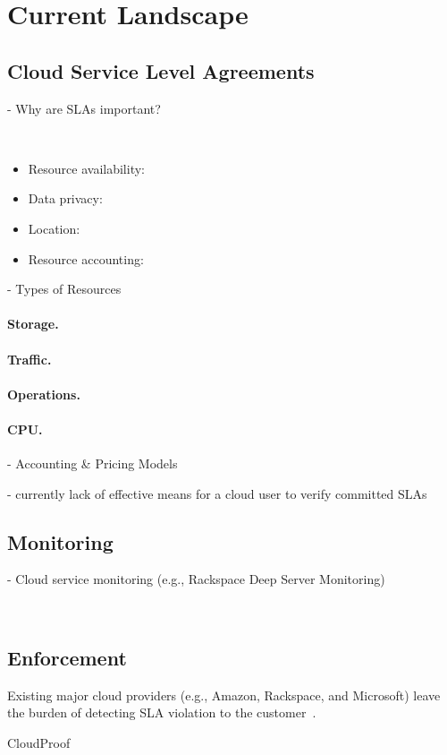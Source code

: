 \section{Current Landscape} \label{sect:current-practice}

\subsection{Cloud Service Level Agreements} \label{sect:sla-overview}

- Why are SLAs important?

~\cite{Ahr+10,FMM+13,Kyr13}

\begin{itemize}
 \item Resource availability:
 \item Data privacy:
 \item Location:
 \item Resource accounting:
\end{itemize}




- Types of Resources

\paragraph{Storage.}

\paragraph{Traffic.}

\paragraph{Operations.}

\paragraph{CPU.}

- Accounting \& Pricing Models~\cite{MMS13}


- currently lack of effective means for a cloud user to verify committed SLAs


\subsection{Monitoring} \label{sect:sla-monitoring}

- Cloud service monitoring (e.g., Rackspace Deep Server Monitoring)

~\cite{ABD+13,FEH+14}

\subsection{Enforcement} \label{sect:sla-enforcement}

Existing major cloud providers (e.g., Amazon, Rackspace, and Microsoft) leave the burden of detecting SLA violation to the customer~\cite{Bas12}.

CloudProof~\cite{PLM+11}